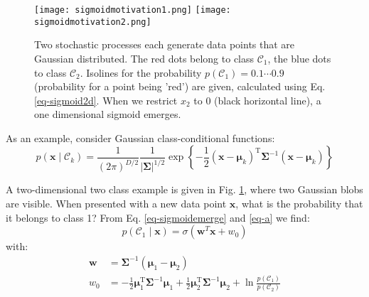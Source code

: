 \begin{figure}[!ht]
  \begin{center}
    \texttt{[image: sigmoidmotivation1.png]}
    \texttt{[image: sigmoidmotivation2.png]} 
  \end{center}
     \caption{Two stochastic processes each generate data points that are Gaussian distributed. The red dots belong to class $\mathcal{C}_1$, the
       blue dots to class $\mathcal{C}_2$. Isolines for the probability $p(\mathcal{C}_1) = 0.1 \cdots 0.9$ (probability for a point being 'red') are given,
       calculated using Eq. \ref{eq-sigmoid2d}. When we restrict $x_2$ to 0 (black horizontal line), a one dimensional sigmoid emerges.}
    \label{fig-twoclass}
  \end{figure}


  As an example, consider Gaussian class-conditional functions:
  \begin{equation}
p\left(\mathbf{x} \mid \mathcal{C}_{k}\right)=\frac{1}{(2 \pi)^{D / 2}} \frac{1}{|\mathbf{\Sigma}|^{1 / 2}} \exp \left\{-\frac{1}{2}\left(\mathbf{x}-\boldsymbol{\mu}_{k}\right)^{\mathrm{T}} \boldsymbol{\Sigma}^{-1}\left(\mathbf{x}-\boldsymbol{\mu}_{k}\right)\right\}     
  \end{equation}


   A two-dimensional two class example is given in Fig. \ref{fig-twoclass}, where two Gaussian blobs are visible. When presented with a new data point $\boldsymbol{x}$,
   what is the probability that it belongs to class 1? From Eq. \ref{eq-sigmoidemerge} and \ref{eq-a} we find:
   \begin{equation}
     p(\mathcal{C}_1 \mid \boldsymbol{x}) = \sigma( \boldsymbol{w}^T \boldsymbol{x} + w_0)
     \label{eq-sigmoidlin}
   \end{equation}
   with:
   \begin{align}
\mathbf{w} &=\boldsymbol{\Sigma}^{-1}\left(\boldsymbol{\mu}_{1}-\boldsymbol{\mu}_{2}\right) \nonumber \\
w_{0} &=-\frac{1}{2} \boldsymbol{\mu}_{1}^{\mathrm{T}} \boldsymbol{\Sigma}^{-1} \boldsymbol{\mu}_{1}+\frac{1}{2} \boldsymbol{\mu}_{2}^{\mathrm{T}} \boldsymbol{\Sigma}^{-1} \boldsymbol{\mu}_{2}+\ln \frac{p\left(\mathcal{C}_{1}\right)}{p\left(\mathcal{C}_{2}\right)} 
\label{eq-weightslogistic}
\end{align} 



